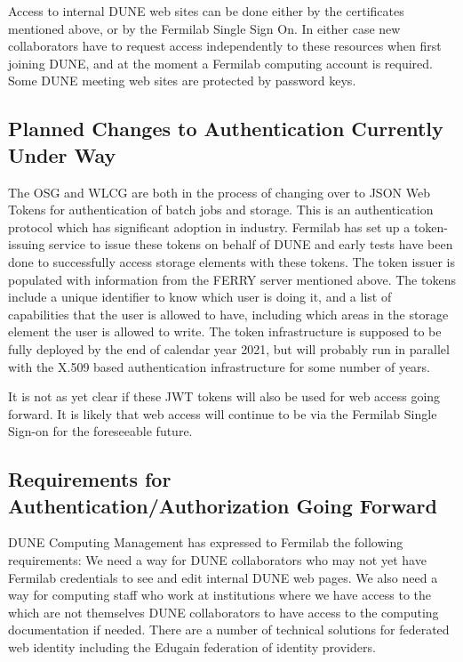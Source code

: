 \documentclass[../main-v1.tex]{subfiles}
\begin{document}
Access to internal DUNE web sites can be done either by the certificates mentioned above, or by the Fermilab 
Single Sign On.  In either case new collaborators have to request access independently to these resources
when first joining DUNE, and at the moment a Fermilab computing account is required.  Some DUNE meeting web sites
are protected by password keys.

\subsection{Planned Changes to Authentication Currently Under Way}

The OSG and WLCG are both in the process of changing over to JSON Web Tokens for authentication of
batch jobs and storage. This is an authentication protocol which has significant adoption in industry.
Fermilab has set up a token-issuing service to issue these tokens on behalf of DUNE and early tests have been 
done to successfully access storage elements with these tokens.  The token issuer is populated with information 
from the FERRY server mentioned above. The tokens include a unique identifier to 
know which user is doing it, and a list of capabilities that the user is allowed to have, including which 
areas in the storage element the user is allowed to write.  The token infrastructure is supposed to 
be fully deployed by the end of calendar year 2021, but will probably run in parallel with the X.509 
based authentication infrastructure for some number of years.

It is not as yet clear if these JWT tokens will also be used for web access going forward.  It is likely 
that web access will continue to be via the Fermilab Single Sign-on for the foreseeable future.  

\subsection{Requirements for Authentication/Authorization Going Forward}

DUNE Computing Management has expressed to Fermilab the following requirements:
We need a way for DUNE collaborators who may not yet have Fermilab credentials to see and edit internal DUNE 
web pages.  We also need a way for computing staff who work at institutions where we have access to the 
which are not themselves DUNE collaborators to have access to the computing documentation if needed.
There are a number of technical solutions for federated web identity including the Edugain federation
of identity providers.  
\end{document}
